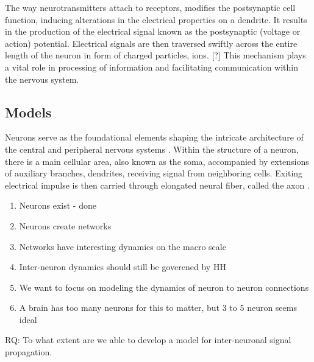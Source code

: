 \documentclass[class={myRUCProject}, crop=false]{standalone}
\begin{document}
The way neurotransmitters attach to receptors, modifies the postsynaptic cell function, inducing alterations in the electrical properties on a dendrite. It results in the production of the electrical signal known as the postsynaptic (voltage or action) potential. Electrical signals are then traversed swiftly across the entire length of the neuron in form of charged particles, ions. [?] This mechanism plays a vital role in processing of information and facilitating communication within the nervous system.


\subsection*{Models}

Neurons serve as the foundational elements shaping the intricate architecture of the central and peripheral nervous systems \cite{shadizadeh2022investigating}. Within the structure of a neuron, there is a main cellular area, also known as the soma, accompanied by extensions of auxiliary branches, dendrites, receiving signal from neighboring cells. Exiting electrical impulse is then carried through elongated neural fiber, called the axon \cite{njitacke2020hidden}.





\begin{enumerate}
    \item Neurons exist - done
    \item Neurons  create networks
    \item Networks have interesting dynamics on the macro scale
    \item Inter-neuron dynamics should still be goverened by HH
    \item We want to focus on modeling the dynamics of neuron to neuron connections
    \item A brain has too many neurons for this to matter, but 3 to 5 neuron seems ideal
\end{enumerate}

RQ: To what extent are we able to develop a model for inter-neuronal signal propagation.


\
\
\end{document}
